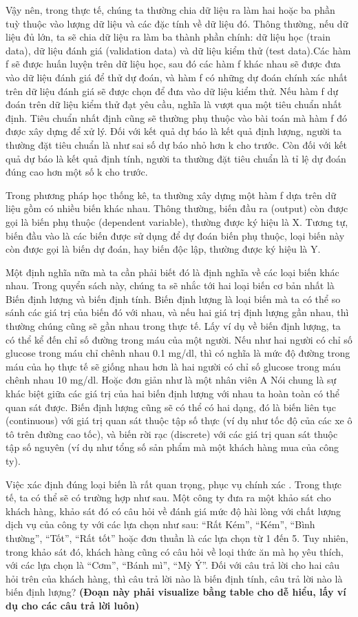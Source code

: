 \documentclass[
  12pt,
]{krantz}
\begin{document}
Vậy nên, trong thực tế, chúng ta thường chia dữ liệu ra làm hai hoặc ba phần tuỳ thuộc vào lượng dữ liệu và các đặc tính về dữ liệu đó. Thông thường, nếu dữ liệu đủ lớn, ta sẽ chia dữ liệu ra làm ba thành phần chính: dữ liệu học (train data), dữ liệu đánh giá (validation data) và dữ liệu kiểm thử (test data).Các hàm f sẽ được huấn luyện trên dữ liệu học, sau đó các hàm f khác nhau sẽ được đưa vào dữ liệu đánh giá để thử dự đoán, và hàm f có những dự đoán chính xác nhất trên dữ liệu đánh giá sẽ được chọn để đưa vào dữ liệu kiểm thử. Nếu hàm f dự đoán trên dữ liệu kiểm thử đạt yêu cầu, nghĩa là vượt qua một tiêu chuẩn nhất định. Tiêu chuẩn nhất định cũng sẽ thường phụ thuộc vào bài toán mà hàm f đó được xây dựng để xử lý. Đối với kết quả dự báo là kết quả định lượng, người ta thường đặt tiêu chuẩn là như sai số dự báo nhỏ hơn k cho trước. Còn đối với kết quả dự báo là kết quả định tính, người ta thường đặt tiêu chuẩn là tỉ lệ dự đoán đúng cao hơn một số k cho trước.

Trong phương pháp học thống kê, ta thường xây dựng một hàm f dựa trên dữ liệu gồm có nhiều biến khác nhau. Thông thường, biến đầu ra (output) còn được gọi là biến phụ thuộc (dependent variable), thường được ký hiệu là X. Tương tự, biến đầu vào là các biến được sử dụng để dự đoán biến phụ thuộc, loại biến này còn được gọi là biến dự đoán, hay biến độc lập, thường được ký hiệu là Y.

Một định nghĩa nữa mà ta cần phải biết đó là định nghĩa về các loại biến khác nhau. Trong quyển sách này, chúng ta sẽ nhắc tới hai loại biến cơ bản nhất là Biến định lượng và biến định tính.
Biến định lượng là loại biến mà ta có thể so sánh các giá trị của biến đó với nhau, và nếu hai giá trị định lượng gần nhau, thì thường chúng cũng sẽ gần nhau trong thực tế. Lấy ví dụ về biến định lượng, ta có thể kể đến chỉ số đường trong máu của một người. Nếu như hai người có chỉ số glucose trong máu chỉ chênh nhau 0.1 mg/dl, thì có nghĩa là mức độ đường trong máu của họ thực tế sẽ giống nhau hơn là hai người có chỉ số glucose trong máu chênh nhau 10 mg/dl. Hoặc đơn giản như là một nhân viên A Nói chung là sự khác biệt giữa các giá trị của hai biến định lượng với nhau ta hoàn toàn có thể quan sát được. Biến định lượng cũng sẽ có thể có hai dạng, đó là biến liên tục (continuous) với giá trị quan sát thuộc tập số thực (ví dụ như tốc độ của các xe ô tô trên đường cao tốc), và biến rời rạc (discrete) với các giá trị quan sát thuộc tập số nguyên (ví dụ như tổng số sản phẩm mà một khách hàng mua của công ty).

Việc xác định đúng loại biến là rất quan trọng, phục vụ chính xác . Trong thực tế, ta có thể sẽ có trường hợp như sau. Một công ty đưa ra một khảo sát cho khách hàng, khảo sát đó có câu hỏi về đánh giá mức độ hài lòng với chất lượng dịch vụ của công ty với các lựa chọn như sau: ``Rất Kém'', ``Kém'', ``Bình thường'', ``Tốt'', ``Rất tốt'' hoặc đơn thuần là các lựa chọn từ 1 đến 5. Tuy nhiên, trong khảo sát đó, khách hàng cũng có câu hỏi về loại thức ăn mà họ yêu thích, với các lựa chọn là ``Cơm'', ``Bánh mì'', ``Mỳ Ý''. Đối với câu trả lời cho hai câu hỏi trên của khách hàng, thì câu trả lời nào là biến định tính, câu trả lời nào là biến định lượng? \textbf{(Đoạn này phải visualize bằng table cho dễ hiểu, lấy ví dụ cho các câu trả lời luôn)}
\end{document}
